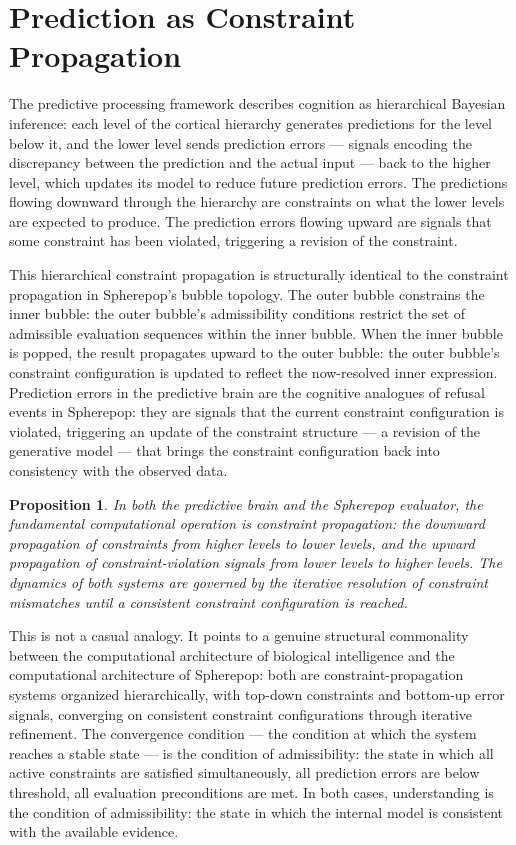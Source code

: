 \documentclass[12pt,openany]{book}
\theoremstyle{plain}
\newtheorem{proposition}[theorem]{Proposition}
\theoremstyle{definition}
\theoremstyle{remark}
\begin{document}
\section{Prediction as Constraint Propagation}

The predictive processing framework describes cognition as hierarchical Bayesian inference: each level of the cortical hierarchy generates predictions for the level below it, and the lower level sends prediction errors — signals encoding the discrepancy between the prediction and the actual input — back to the higher level, which updates its model to reduce future prediction errors. The predictions flowing downward through the hierarchy are constraints on what the lower levels are expected to produce. The prediction errors flowing upward are signals that some constraint has been violated, triggering a revision of the constraint.

This hierarchical constraint propagation is structurally identical to the constraint propagation in Spherepop's bubble topology. The outer bubble constrains the inner bubble: the outer bubble's admissibility conditions restrict the set of admissible evaluation sequences within the inner bubble. When the inner bubble is popped, the result propagates upward to the outer bubble: the outer bubble's constraint configuration is updated to reflect the now-resolved inner expression. Prediction errors in the predictive brain are the cognitive analogues of refusal events in Spherepop: they are signals that the current constraint configuration is violated, triggering an update of the constraint structure — a revision of the generative model — that brings the constraint configuration back into consistency with the observed data.

\begin{proposition}
In both the predictive brain and the Spherepop evaluator, the fundamental computational operation is constraint propagation: the downward propagation of constraints from higher levels to lower levels, and the upward propagation of constraint-violation signals from lower levels to higher levels. The dynamics of both systems are governed by the iterative resolution of constraint mismatches until a consistent constraint configuration is reached.
\end{proposition}

This is not a casual analogy. It points to a genuine structural commonality between the computational architecture of biological intelligence and the computational architecture of Spherepop: both are constraint-propagation systems organized hierarchically, with top-down constraints and bottom-up error signals, converging on consistent constraint configurations through iterative refinement. The convergence condition — the condition at which the system reaches a stable state — is the condition of admissibility: the state in which all active constraints are satisfied simultaneously, all prediction errors are below threshold, all evaluation preconditions are met. In both cases, understanding is the condition of admissibility: the state in which the internal model is consistent with the available evidence.
\end{document}
